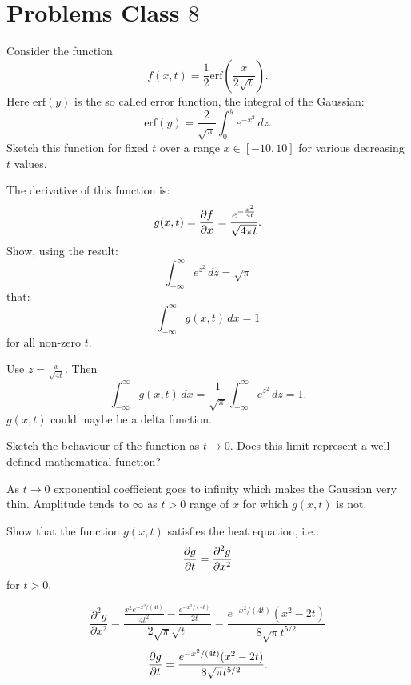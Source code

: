 \documentclass[10pt, a4paper]{article}
\begin{document}
\newpage

\section{Problems Class \texorpdfstring{$8$}{}}
\begin{problem}
    Consider the function
    \[
    f(x, t) = \frac{1}{2}\mathrm{erf}\left(\frac{x}{2\sqrt{t}}\right).
    \]
    Here $\mathrm{erf}(y)$ is the so called error function,
    the integral of the Gaussian:
    \[
    \mathrm{erf}(y) = \frac{2}{\sqrt{\pi}}\int_{0}^{y}e ^ {-x ^ 2}\,dz.
    \]
    Sketch this function for fixed $t$ over a range $x \in [-10, 10]$ for various decreasing $t$ values.
\end{problem}

\begin{problem}
    The derivative of this function is:
    \[
    g(x, t) = \pd[f]{x} = \frac{e ^ {-\frac{x ^ 2}{4t}}}{\sqrt{4\pi t}}.
    \]
    Show,
    using the result:
    \[
    \int_{-\infty}^{\infty}e ^ {z ^ 2}\,dz = \sqrt{\pi}
    \]
    that:
    \[
    \int_{-\infty}^{\infty}g(x, t)\,dx = 1
    \]
    for all non-zero $t$.

    \begin{solution}
        Use $z = \frac{x}{\sqrt{4t}}$.
        Then
        \[
        \int_{-\infty}^{\infty}g(x, t)\,dx = \frac{1}{\sqrt{\pi}}\int_{-\infty}^{\infty}e ^ {z ^ 2}\,dz = 1.
        \]
        $g(x, t)$ could maybe be a delta function.
    \end{solution}
\end{problem}

\begin{problem}
    Sketch the behaviour of the function as $t \to 0$.
    Does this limit represent a well defined mathematical function?

    \begin{solution}
        As $t \to 0$ exponential coefficient goes to infinity which makes the Gaussian very thin.
        Amplitude tends to $\infty$ as $t > 0$ range of $x$ for which $g(x, t)$ is not.
    \end{solution}
\end{problem}

\begin{problem}
    Show that the function $g(x, t)$ satisfies the heat equation,
    i.e.:
    \[
    \pd[g]{t} = \frac{\partial ^ 2g}{\partial x ^ 2}
    \]
    for $t > 0$.

    \begin{solution}
        \[
        \frac{\partial ^ 2g}{\partial x ^ 2} = \frac{\frac{x ^ 2e ^ {-x ^ 2 / (4t)}}{4t ^ 2} - \frac{e ^ {-x ^ 2/(4t)}}{2t}}{2\sqrt{\pi}\sqrt{t}} = \frac{e ^ {-x ^ 2/(4t)}(x ^ 2 - 2t)}{8\sqrt{\pi}t ^ {5 / 2}}
        \]
        \[
        \pd[g]{t} = \frac{e ^ {-x ^ 2 / (4t)}(x ^ 2 - 2t)}{8\sqrt{\pi}t ^ {5 / 2}}.
        \]
    \end{solution}
\end{problem}
\end{document}
